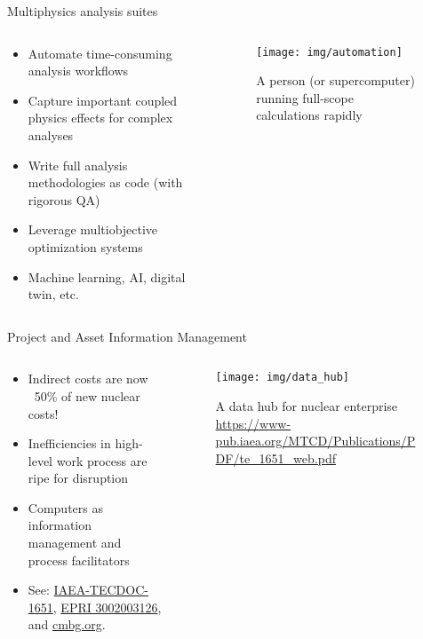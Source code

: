 \documentclass[pdf,aspectratio=169]{beamer}
\begin{document}
\begin{frame}{Multiphysics analysis suites}
\begin{columns}
    \begin{column}{0.5\textwidth}
    \begin{itemize}
        \item Automate time-consuming analysis workflows 
        \item Capture important coupled physics effects for complex analyses
        \item Write full analysis methodologies as code (with rigorous QA)
        \item Leverage multiobjective optimization systems
        \item Machine learning, AI, digital twin, etc.
    \end{itemize}
    \end{column}
    \begin{column}{0.5\textwidth}
        \begin{figure}[ht]
        \centering
            \texttt{[image: img/automation]}
            \caption{\tiny A person (or supercomputer) running full-scope calculations
            rapidly}
        \end{figure}
    \end{column}
\end{columns}
\end{frame}

\begin{frame}{Project and Asset Information Management}
\begin{columns}
    \begin{column}{0.5\textwidth}
    \begin{itemize}
        \item Indirect costs are now ~50\% of new nuclear costs!
        \item Inefficiencies in high-level work process are ripe for disruption
        \item Computers as information management and process facilitators
        \item See:
            \href{https://www.iaea.org/publications/8438/information-technology-for-nuclear-power-plant-configuration-management}{IAEA-TECDOC-1651},
            \href{https://www.epri.com/research/products/3002003126}{EPRI 3002003126}, and
            \href{http://cmbg.org}{cmbg.org}.
    \end{itemize}
    \end{column}
    \begin{column}{0.5\textwidth}
        \begin{figure}[ht]
        \centering
            \texttt{[image: img/data\_hub]}
            \caption{\tiny A data hub for nuclear enterprise
            \url{https://www-pub.iaea.org/MTCD/Publications/PDF/te_1651_web.pdf}}
        \end{figure}
    \end{column}
\end{columns}
\end{frame}
\end{document}
